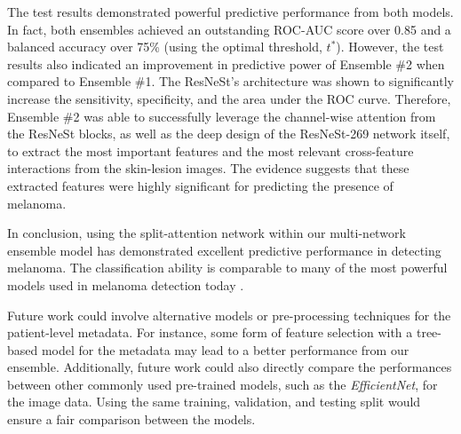 \documentclass [MAS] {uclathes}
\begin{document}
The test results demonstrated powerful predictive performance from both models. In fact, both ensembles achieved an outstanding ROC-AUC score over 0.85 and a balanced accuracy over 75\% (using the optimal threshold, $t^*$). However, the test results also indicated an improvement in predictive power of Ensemble \#2 when compared to Ensemble \#1. The ResNeSt's architecture was shown to significantly increase the sensitivity, specificity, and the area under the ROC curve. Therefore, Ensemble \#2 was able to successfully leverage the channel-wise attention from the ResNeSt blocks, as well as the deep design of the ResNeSt-269 network itself, to extract the most important features and the most relevant cross-feature interactions from the skin-lesion images. The evidence suggests that these extracted features were highly significant for predicting the presence of melanoma.

In conclusion, using the split-attention network within our multi-network ensemble model has demonstrated excellent predictive performance in detecting melanoma. The classification ability is comparable to many of the most powerful models used in melanoma detection today \cite{EffNet_MelDet}. 

Future work could involve alternative models or pre-processing techniques for the patient-level metadata. For instance, some form of feature selection with a tree-based model for the metadata may lead to a better performance from our ensemble. Additionally, future work could also directly compare the performances between other commonly used pre-trained models, such as the \textit{EfficientNet}, for the image data. Using the same training, validation, and testing split would ensure a fair comparison between the models.


\end{document}
